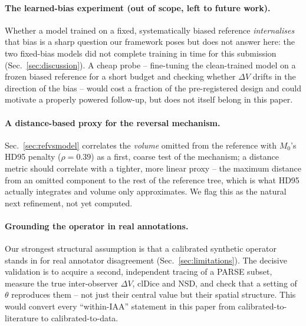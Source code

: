 \documentclass[
    bookmarks, bookmarksnumbered, bookmarksopen,
    colorlinks=true, citecolor=blue, linkcolor=blue, urlcolor=blue
]{techrep}
\begin{document}
\paragraph{The learned-bias experiment (out of scope, left to future work).} Whether a model
trained on a fixed, systematically biased reference \emph{internalises} that bias is a sharp
question our framework poses but does not answer here: the two fixed-bias models did not complete
training in time for this submission (Sec.~\ref{sec:discussion}). A cheap probe -- fine-tuning the
clean-trained model on a frozen biased reference for a short budget and checking whether $\Delta V$
drifts in the direction of the bias -- would cost a fraction of the pre-registered design and could
motivate a properly powered follow-up, but does not itself belong in this paper.

\paragraph{A distance-based proxy for the reversal mechanism.} Sec.~\ref{sec:refvsmodel} correlates
the \emph{volume} omitted from the reference with $M_0$'s HD95 penalty ($\rho{=}0.39$) as a
first, coarse test of the mechanism; a distance metric should correlate with a tighter, more
linear proxy -- the maximum distance from an omitted component to the rest of the reference tree,
which is what HD95 actually integrates and volume only approximates. We flag this as the natural
next refinement, not yet computed.

\paragraph{Grounding the operator in real annotations.} Our strongest structural assumption is
that a calibrated synthetic operator stands in for real annotator disagreement
(Sec.~\ref{sec:limitations}). The decisive validation is to acquire a second, independent tracing
of a PARSE subset, measure the true inter-observer $\Delta V$, clDice and NSD, and check that a
setting of $\theta$ reproduces them -- not just their central value but their spatial structure.
This would convert every ``within-IAA'' statement in this paper from calibrated-to-literature to
calibrated-to-data.

\end{document}
